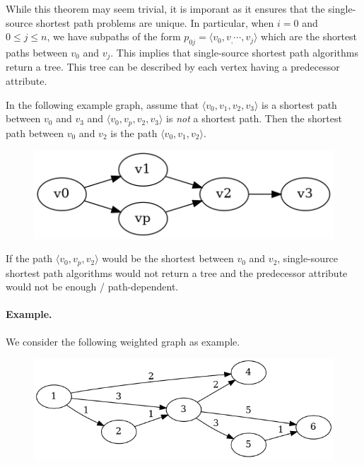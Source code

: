 While this theorem may seem trivial, it is imporant as it ensures that the single-source shortest path problems are unique. In particular, when $i=0$ and $0 \leq j \leq n$, we have subpaths of the form $p_{0j} = \langle v_0,v_,\cdots,v_j \rangle$ which are the shortest paths between $v_0$ and $v_j$. This implies that single-source shortest path algorithms return a tree. This tree can be described by each vertex having a predecessor attribute.   

In the following example graph, assume that $\langle v_0, v_1, v_2, v_3 \rangle$ is a shortest path between $v_0$ and $v_3$ and  $\langle v_0, v_p, v_2, v_3 \rangle$ is \emph{not} a shortest path. Then the shortest path between $v_0$ and $v_2$ is the path $\langle v_0, v_1, v_2 \rangle$.

\begin{figure}[H]
\centering
\includegraphics[scale=0.5]{images/sssp_0.png}
\end{figure}

If the path $\langle v_0, v_p, v_2 \rangle$ would be the shortest between $v_0$ and $v_2$, single-source shortest path algorithms would not return a tree and the predecessor attribute would not be enough / path-dependent.


\paragraph{Example.} We consider the following weighted graph as example.


\begin{figure}[H]
\centering
\includegraphics[scale=0.5]{images/sssp_1.png}
\end{figure}


